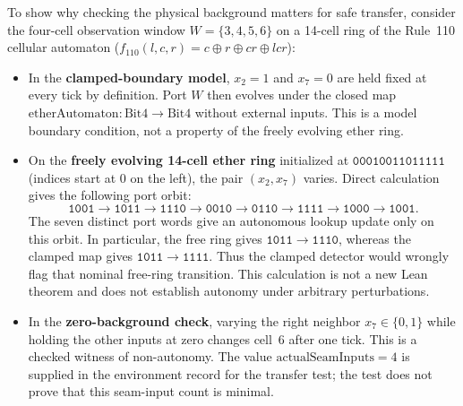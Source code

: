 \documentclass[11pt,a4paper]{article}
\theoremstyle{cleanthm}
\begin{document}
To show why checking the physical background matters for safe transfer, consider the four-cell observation window $W=\{3,4,5,6\}$ on a 14-cell ring of the Rule~110 cellular automaton ($f_{110}(l,c,r)=c\oplus r\oplus cr\oplus lcr$):
\begin{itemize}
\item In the \textbf{clamped-boundary model}, $x_2=1$ and $x_7=0$ are held fixed at every tick by definition. Port $W$ then evolves under the closed map $\mathrm{etherAutomaton}:\mathrm{Bit4}\to\mathrm{Bit4}$ without external inputs. This is a model boundary condition, not a property of the freely evolving ether ring.
\item On the \textbf{freely evolving 14-cell ether ring} initialized at $\mathtt{00010011011111}$ (indices start at 0 on the left), the pair $(x_2,x_7)$ varies. Direct calculation gives the following port orbit:
\[
\mathtt{1001}\to\mathtt{1011}\to\mathtt{1110}\to\mathtt{0010}\to
\mathtt{0110}\to\mathtt{1111}\to\mathtt{1000}\to\mathtt{1001}.
\]
The seven distinct port words give an autonomous lookup update only on this orbit. In particular, the free ring gives $\mathtt{1011}\to\mathtt{1110}$, whereas the clamped map gives $\mathtt{1011}\to\mathtt{1111}$. Thus the clamped detector would wrongly flag that nominal free-ring transition. This calculation is not a new Lean theorem and does not establish autonomy under arbitrary perturbations.
\item In the \textbf{zero-background check}, varying the right neighbor $x_7\in\{0,1\}$ while holding the other inputs at zero changes cell~6 after one tick. This is a checked witness of non-autonomy. The value $\mathrm{actualSeamInputs}=4$ is supplied in the environment record for the transfer test; the test does not prove that this seam-input count is minimal.
\end{itemize}
\end{document}
